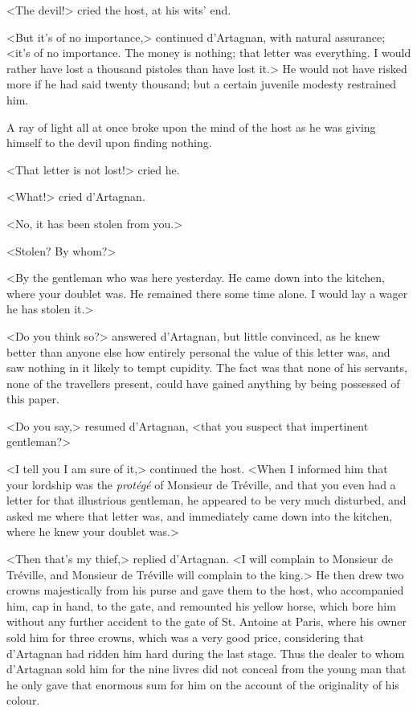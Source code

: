 <The devil!> cried the host, at his wits' end. 

<But it's of no importance,> continued d'Artagnan, with natural assurance; <it's of no importance. The money is nothing; that letter was everything. I would rather have lost a thousand pistoles than have lost it.> He would not have risked more if he had said twenty thousand; but a certain juvenile modesty restrained him. 

A ray of light all at once broke upon the mind of the host as he was giving himself to the devil upon finding nothing. 

<That letter is not lost!> cried he. 

<What!> cried d'Artagnan. 

<No, it has been stolen from you.> 

<Stolen? By whom?> 

<By the gentleman who was here yesterday. He came down into the kitchen, where your doublet was. He remained there some time alone. I would lay a wager he has stolen it.> 

<Do you think so?> answered d'Artagnan, but little convinced, as he knew better than anyone else how entirely personal the value of this letter was, and saw nothing in it likely to tempt cupidity. The fact was that none of his servants, none of the travellers present, could have gained anything by being possessed of this paper. 

<Do you say,> resumed d'Artagnan, <that you suspect that impertinent gentleman?> 

<I tell you I am sure of it,> continued the host. <When I informed him that your lordship was the \textit{protégé} of Monsieur de Tréville, and that you even had a letter for that illustrious gentleman, he appeared to be very much disturbed, and asked me where that letter was, and immediately came down into the kitchen, where he knew your doublet was.> 

<Then that's my thief,> replied d'Artagnan. <I will complain to Monsieur de Tréville, and Monsieur de Tréville will complain to the king.> He then drew two crowns majestically from his purse and gave them to the host, who accompanied him, cap in hand, to the gate, and remounted his yellow horse, which bore him without any further accident to the gate of St. Antoine at Paris, where his owner sold him for three crowns, which was a very good price, considering that d'Artagnan had ridden him hard during the last stage. Thus the dealer to whom d'Artagnan sold him for the nine livres did not conceal from the young man that he only gave that enormous sum for him on the account of the originality of his colour. 

